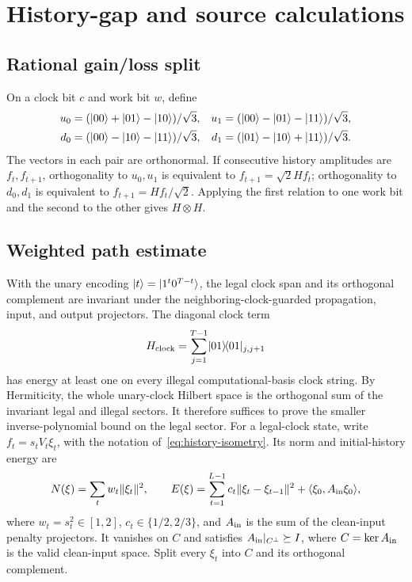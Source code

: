 \section{History-gap and source calculations}
\label{app:source-details}

\subsection{Rational gain/loss split}
\label{app:rational-split}

On a clock bit \(c\) and work bit \(w\), define
\[
\begin{aligned}
u_0&=(\lvert 00\rangle+\lvert 01\rangle-\lvert 10\rangle)/\sqrt3,&
u_1&=(\lvert 00\rangle-\lvert 01\rangle-\lvert 11\rangle)/\sqrt3,\\
d_0&=(\lvert 00\rangle-\lvert 10\rangle-\lvert 11\rangle)/\sqrt3,&
d_1&=(\lvert 01\rangle-\lvert 10\rangle+\lvert 11\rangle)/\sqrt3.
\end{aligned}
\]
The vectors in each pair are orthonormal.  If consecutive history amplitudes
are \(f_t,f_{t+1}\), orthogonality to \(u_0,u_1\) is equivalent to
\(f_{t+1}=\sqrt2Hf_t\); orthogonality to \(d_0,d_1\) is equivalent to
\(f_{t+1}=Hf_t/\sqrt2\).  Applying the first relation to one work bit and the
second to the other gives \(H\otimes H\).

\subsection{Weighted path estimate}

With the unary encoding \(\lvert t\rangle=\lvert 1^t0^{T-t}\rangle\), the legal clock span and
its orthogonal complement are invariant under the neighboring-clock-guarded
propagation, input, and output projectors.  The diagonal clock term
\[
H_{\rm clock}=\sum_{j=1}^{T-1}\lvert 01\rangle\!\langle 01\rvert_{j,j+1}
\]
has energy at least one on every illegal computational-basis clock string.
By Hermiticity, the whole unary-clock Hilbert space is the orthogonal sum of
the invariant legal and illegal sectors.  It therefore
suffices to prove the smaller inverse-polynomial bound on the legal sector.
For a legal-clock state, write \(f_t=s_tV_t\xi_t\), with the notation of~\cref{eq:history-isometry}. Its norm and initial-history energy are
\[
N(\xi)=\sum_tw_t\|\xi_t\|^2,
\qquad
E(\xi)=\sum_{t=1}^{L-1}c_t\|\xi_t-\xi_{t-1}\|^2
+\langle\xi_0,A_{\rm in}\xi_0\rangle,
\]
where \(w_t=s_t^2\in[1,2]\), \(c_t\in\{1/2,2/3\}\), and
\(A_{\rm in}\) is the sum of the clean-input penalty projectors.  It vanishes
on \(C\) and satisfies \(A_{\rm in}|_{C^\perp}\succeq I\), where
\(C=\ker A_{\rm in}\) is the valid clean-input space.  Split every \(\xi_t\)
into \(C\) and its orthogonal complement.

